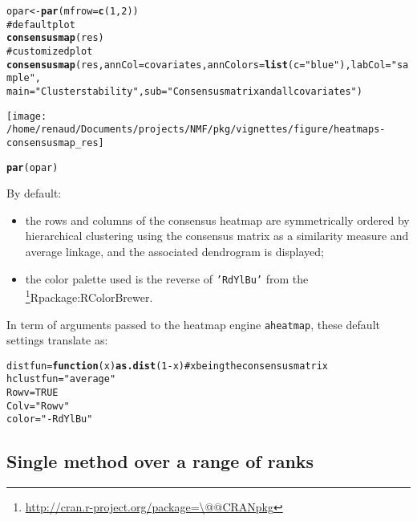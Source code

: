 \documentclass[a4paper]{article}\usepackage{graphicx, color}
\makeatletter
\def\maxwidth{ %
  \ifdim\Gin@nat@width>\linewidth
    \linewidth
  \else
    \Gin@nat@width
  \fi
}
\newcommand{\hlfunctioncall}[1]{\textcolor[rgb]{0.501960784313725,0,0.329411764705882}{\textbf{#1}}}%
\newcommand{\hlstring}[1]{\textcolor[rgb]{0.6,0.6,1}{#1}}%
\newcommand{\hlcomment}[1]{\textcolor[rgb]{0.180392156862745,0.6,0.341176470588235}{#1}}%
\newenvironment{kframe}{%
 \def\at@end@of@kframe{}%
 \ifinner\ifhmode%
  \def\at@end@of@kframe{\end{minipage}}%
  \begin{minipage}{\columnwidth}%
 \fi\fi%
 \def\FrameCommand##1{\hskip\@totalleftmargin \hskip-\fboxsep
 \colorbox{shadecolor}{##1}\hskip-\fboxsep
     \hskip-\linewidth \hskip-\@totalleftmargin \hskip\columnwidth}%
 \MakeFramed {\advance\hsize-\width
   \@totalleftmargin\z@ \linewidth\hsize
   \@setminipage}}%
 {\par\unskip\endMakeFramed%
 \at@end@of@kframe}
\newenvironment{knitrout}{}{} %
\let\code=\texttt
\newcommand{\pkgname}[1]{\textit{#1}\xspace}
\newcommand{\CRANurl}[1]{\url{http://cran.r-project.org/package=#1}}
\def\CRANpkg{\@ifstar\@CRANpkg\@@CRANpkg}
\def\@CRANpkg#1{\href{http://cran.r-project.org/package=#1}{\pkgname{#1}}\footnote{\CRANurl{#1}}}
\def\@@CRANpkg#1{\href{http://cran.r-project.org/package=#1}{\pkgname{#1}} package\footnote{\CRANurl{#1}}}
\def\citeCRANpkg{\@ifstar\@citeCRANpkg\@@citeCRANpkg}
\def\@citeCRANpkg#1{\CRANpkg{#1}\cite*{Rpackage:#1}}
\def\@@citeCRANpkg#1{\CRANpkg{#1}~\cite{Rpackage:#1}}
\renewcommand{\cite}[1]{\parencite{#1}}
\makeatother
\begin{document}
\begin{knitrout}
\color{fgcolor}\begin{kframe}
\begin{alltt}
opar <- \hlfunctioncall{par}(mfrow = \hlfunctioncall{c}(1, 2))
\hlcomment{# default plot}
\hlfunctioncall{consensusmap}(res)
\hlcomment{# customized plot}
\hlfunctioncall{consensusmap}(res, annCol = covariates, annColors = \hlfunctioncall{list}(c = \hlstring{"blue"}), labCol = \hlstring{"sample "}, 
    main = \hlstring{"Cluster stability"}, sub = \hlstring{"Consensus matrix and all covariates"})
\end{alltt}
\end{kframe}
\texttt{[image: /home/renaud/Documents/projects/NMF/pkg/vignettes/figure/heatmaps-consensusmap\_res]} 
\begin{kframe}\begin{alltt}
\hlfunctioncall{par}(opar)
\end{alltt}
\end{kframe}
\end{knitrout}


By default:
\begin{itemize}
\item the rows and columns of the consensus heatmap are symmetrically 
ordered by hierarchical clustering using the consensus matrix as a similarity 
measure and average linkage, and the associated dendrogram is displayed;
\item the color palette used is the reverse of \code{'RdYlBu'} from the \citeCRANpkg{RColorBrewer}.
\end{itemize}

In term of arguments passed to the heatmap engine \code{aheatmap}, these default 
settings translate as:

\begin{knitrout}
\color{fgcolor}\begin{kframe}
\begin{alltt}
distfun = \hlfunctioncall{function}(x) \hlfunctioncall{as.dist}(1 - x)  \hlcomment{# x being the consensus matrix}
hclustfun = \hlstring{"average"}
Rowv = TRUE
Colv = \hlstring{"Rowv"}
color = \hlstring{"-RdYlBu"}
\end{alltt}
\end{kframe}
\end{knitrout}


\subsection{Single method over a range of ranks}
\end{document}
